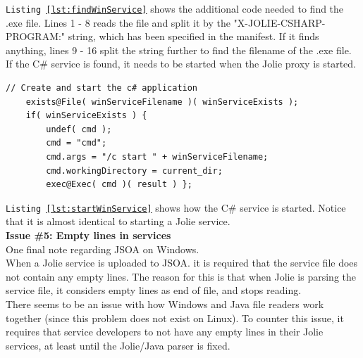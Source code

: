 \documentclass[12pt,a4paper]{article}
\begin{document}
\texttt{Listing \ref{lst:findWinService}} shows the additional code needed to find the .exe file. Lines 1 - 8 reads the file and split it by the "X-JOLIE-CSHARP-PROGRAM:" string, which has been specified in the manifest. If it finds anything, lines 9 - 16 split the string further to find the filename of the .exe file.\\
If the C\# service is found, it needs to be started when the Jolie proxy is started.

\begin{lstlisting}[caption={Start C\# service},label={lst:startWinService}]
// Create and start the c# application                                                                                                                                                                   
    exists@File( winServiceFilename )( winServiceExists );                                                                                                                                               
    if( winServiceExists ) {                                                                                                                                                                                 
        undef( cmd );                                                                                                                                                                                        
        cmd = "cmd";                                                                                                                                                                                         
        cmd.args = "/c start " + winServiceFilename;
        cmd.workingDirectory = current_dir;                                                                                                                                                                  
        exec@Exec( cmd )( result ) };
\end{lstlisting}

\texttt{Listing \ref{lst:startWinService}} shows how the C\# service is started. Notice that it is almost identical to starting a Jolie service.\\

\textbf{Issue \#5: Empty lines in services} \\
One final note regarding JSOA on Windows.\\
When a Jolie service is uploaded to JSOA. it is required that the service file does not contain any empty lines. The reason for this is that when Jolie is parsing the service file, it considers empty lines as end of file, and stops reading. \\
There seems to be an issue with how Windows and Java file readers work together (since this problem does not exist on Linux). To counter this issue, it requires that service developers to not have any empty lines in their Jolie services, at least until the Jolie/Java parser is fixed. 
\end{document}
